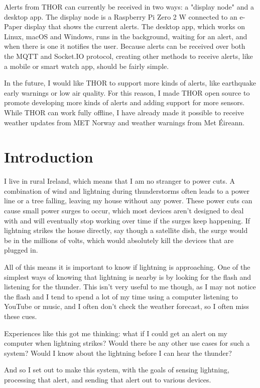 \documentclass{report}
\begin{document}
	Alerts from THOR can currently be received in two ways: a "display node" and a desktop app. The display node is a Raspberry Pi Zero 2 W connected to an e-Paper display that shows the current alerts. The desktop app, which works on Linux, macOS and Windows, runs in the background, waiting for an alert, and when there is one it notifies the user. Because alerts can be received over both the MQTT and Socket.IO protocol, creating other methods to receive alerts, like a mobile or smart watch app, should be fairly simple.
	
	In the future, I would like THOR to support more kinds of alerts, like earthquake early warnings or low air quality. For this reason, I made THOR open source to promote developing more kinds of alerts and adding support for more sensors. While THOR can work fully offline, I have already made it possible to receive weather updates from MET Norway and weather warnings from Met Éireann.
	
	\tableofcontents
	
	\chapter{Introduction}
	I live in rural Ireland, which means that I am no stranger to power cuts. A combination of wind and lightning during thunderstorms often leads to a power line or a tree falling, leaving my house without any power. These power cuts can cause small power surges to occur, which most devices aren't designed to deal with and will eventually stop working over time if the surges keep happening. If lightning strikes the house directly, say though a satellite dish, the surge would be in the millions of volts, which would absolutely kill the devices that are plugged in\cite{noaafaq}.
	
	All of this means it is important to know if lightning is approaching. One of the simplest ways of knowing that lightning is nearby is by looking for the flash and listening for the thunder. This isn't very useful to me though, as I may not notice the flash and I tend to spend a lot of my time using a computer listening to YouTube or music, and I often don't check the weather forecast, so I often miss these cues.
	
	Experiences like this got me thinking: what if I could get an alert on my computer when lightning strikes? Would there be any other use cases for such a system? Would I know about the lightning before I can hear the thunder?
	
	And so I set out to make this system, with the goals of sensing lightning, processing that alert, and sending that alert out to various devices.
	
\end{document}
